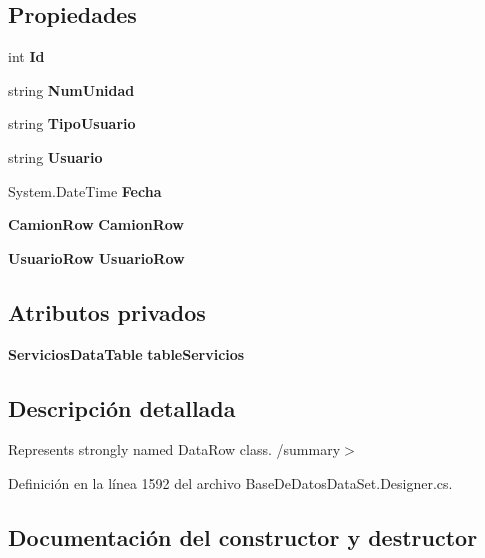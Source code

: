 \subsection*{Propiedades}
\begin{DoxyCompactItemize}
\item 
int {\bf Id}\hspace{0.3cm}{\ttfamily  [get, set]}
\item 
string {\bf Num\-Unidad}\hspace{0.3cm}{\ttfamily  [get, set]}
\item 
string {\bf Tipo\-Usuario}\hspace{0.3cm}{\ttfamily  [get, set]}
\item 
string {\bf Usuario}\hspace{0.3cm}{\ttfamily  [get, set]}
\item 
System.\-Date\-Time {\bf Fecha}\hspace{0.3cm}{\ttfamily  [get, set]}
\item 
{\bf Camion\-Row} {\bf Camion\-Row}\hspace{0.3cm}{\ttfamily  [get, set]}
\item 
{\bf Usuario\-Row} {\bf Usuario\-Row}\hspace{0.3cm}{\ttfamily  [get, set]}
\end{DoxyCompactItemize}
\subsection*{Atributos privados}
\begin{DoxyCompactItemize}
\item 
{\bf Servicios\-Data\-Table} {\bf table\-Servicios}
\end{DoxyCompactItemize}


\subsection{Descripción detallada}
Represents strongly named Data\-Row class. /summary$>$ 

Definición en la línea 1592 del archivo Base\-De\-Datos\-Data\-Set.\-Designer.\-cs.



\subsection{Documentación del constructor y destructor}
